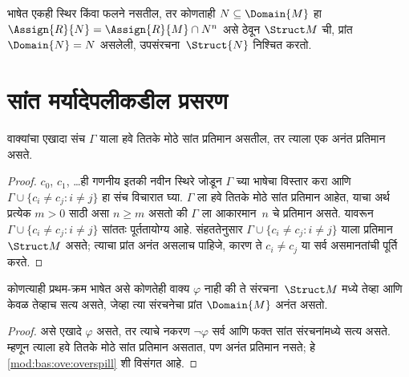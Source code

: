 \begin{rem}
\label{mod:bas:sub:rem:substructure}
भाषेत एकही स्थिर किंवा फलने नसतील, तर कोणताही $N
\subseteq \Domain{M}$ हा $\Assign{R}{N} = \Assign{R}{M} \cap N^n$
असे ठेवून $\Struct M$ ची, प्रांत~$\Domain{N} = N$ असलेली,
उपसंरचना~$\Struct{N}$ निश्चित करतो.
\end{rem}













\section{सांत मर्यादेपलीकडील प्रसरण}\label{mod:bas:ove:sec}

\begin{thm}
\label{mod:bas:ove:overspill} वाक्यांचा एखादा संच $\Gamma$ याला हवे तितके मोठे
सांत प्रतिमान असतील, तर त्याला एक अनंत प्रतिमान असते.
\end{thm}

\begin{proof}
$c_0$, $c_1$, \dots ही गणनीय इतकी नवीन स्थिरे जोडून $\Gamma$ च्या भाषेचा
विस्तार करा आणि $\Gamma \cup \{c_i \neq c_j : i \neq j\}$ हा संच विचारात
घ्या. $\Gamma$ ला हवे तितके मोठे सांत प्रतिमान आहेत, याचा अर्थ प्रत्येक
$m >0$ साठी असा $n\ge m$ असतो की $\Gamma$ ला आकारमान~$n$ चे प्रतिमान
असते. यावरून $\Gamma \cup \{c_i \neq c_j : i \neq j\}$ सांततः
पूर्ततायोग्य आहे. संहततेनुसार $\Gamma \cup \{c_i \neq c_j : i \neq j\}$
याला प्रतिमान $\Struct M$ असते; त्याचा प्रांत अनंत असलाच पाहिजे, कारण ते
$c_i \neq c_j$ या सर्व असमानतांची पूर्ति करते.
\end{proof}

\begin{prop}
\label{mod:bas:ove:inf-not-fo}
कोणत्याही प्रथम-क्रम भाषेत असे कोणतेही वाक्य $\varphi$ नाही की ते
संरचना~$\Struct M$ मध्ये तेव्हा आणि केवळ तेव्हाच सत्य असते, जेव्हा
त्या संरचनेचा प्रांत $\Domain{M}$ अनंत असतो.
\end{prop}

\begin{proof}
असे एखादे $\varphi$ असते, तर त्याचे नकरण $\lnot \varphi$ सर्व आणि फक्त सांत
संरचनांमध्ये सत्य असते. म्हणून त्याला हवे तितके मोठे सांत प्रतिमान
असतात, पण अनंत प्रतिमान नसते; हे \ref{mod:bas:ove:overspill} शी विसंगत आहे.
\end{proof}











